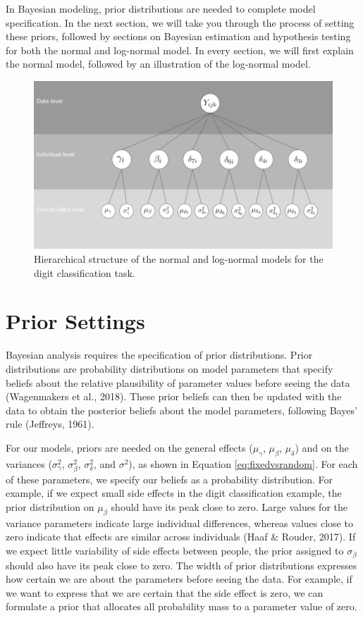 \documentclass[
  english,
  doc,floatsintext]{apa6}
\begin{document}
In Bayesian modeling, prior distributions are needed to complete model specification. In the next section, we will take you through the process of setting these priors, followed by sections on Bayesian estimation and hypothesis testing for both the normal and log-normal model. In every section, we will first explain the normal model, followed by an illustration of the log-normal model.

\begin{figure}[H]

\includegraphics[width=0.7\linewidth]{I - Images/Fig2_Hierarchical structure} \hfill{}

\caption{Hierarchical structure of the normal and log-normal models for the digit classification task.}\label{fig:hierarchyplot}
\end{figure}

\hypertarget{prior-settings}{%
\section{Prior Settings}\label{prior-settings}}

Bayesian analysis requires the specification of prior distributions. Prior distributions are probability distributions on model parameters that specify beliefs about the relative plausibility of parameter values before seeing the data (Wagenmakers et al., 2018). These prior beliefs can then be updated with the data to obtain the posterior beliefs about the model parameters, following Bayes' rule (Jeffreys, 1961).

For our models, priors are needed on the general effects (\(\mu_{\gamma}\), \(\mu_{\beta}\), \(\mu_{\delta}\)) and on the variances (\(\sigma_{\gamma}^2\), \(\sigma_{\beta}^2\), \(\sigma_{\delta}^2\), and \(\sigma^2\)), as shown in Equation \eqref{eq:fixedvsrandom}. For each of these parameters, we specify our beliefs as a probability distribution. For example, if we expect small side effects in the digit classification example, the prior distribution on \(\mu_{\beta}\) should have its peak close to zero. Large values for the variance parameters indicate large individual differences, whereas values close to zero indicate that effects are similar across individuals (Haaf \& Rouder, 2017). If we expect little variability of side effects between people, the prior assigned to \(\sigma_{\beta}\) should also have its peak close to zero. The width of prior distributions expresses how certain we are about the parameters before seeing the data. For example, if we want to express that we are certain that the side effect is zero, we can formulate a prior that allocates all probability mass to a parameter value of zero.
\end{document}

